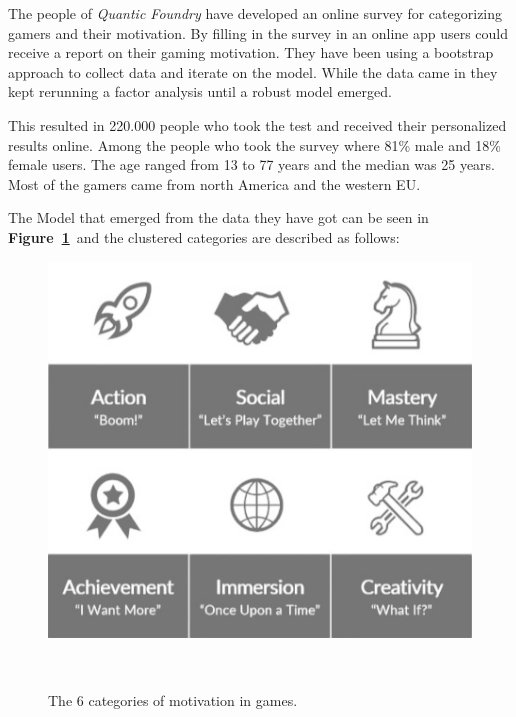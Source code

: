 The people of \textit{Quantic Foundry} have developed an online survey for categorizing 
gamers and their motivation. By filling in the survey in an 
online app users could receive a report on their gaming motivation. They have been using a bootstrap approach to collect data and iterate on the model. While the 
data came in they kept rerunning a factor analysis until a robust model 
emerged. 

This resulted in 220.000 people who took the test and received their 
personalized results online. Among the people who took the survey where 81\% 
male and 18\% female users. The age ranged from 13 to 77 years and the median 
was 25 years. Most of the gamers came from north America and the western EU.

The Model that emerged from the data they have got can be seen in 
\textbf{Figure~\ref{fig:gameMotivation}}~\footnotemark[6] and the clustered 
categories are described as follows:

\begin{figure}
	\centering
	\includegraphics[width=0.99\columnwidth]{./figures/motivation}
	\caption[motivation]{The 6 categories of motivation in games. 
	\footnotemark[6]}~\label{fig:gameMotivation}
\end{figure}

